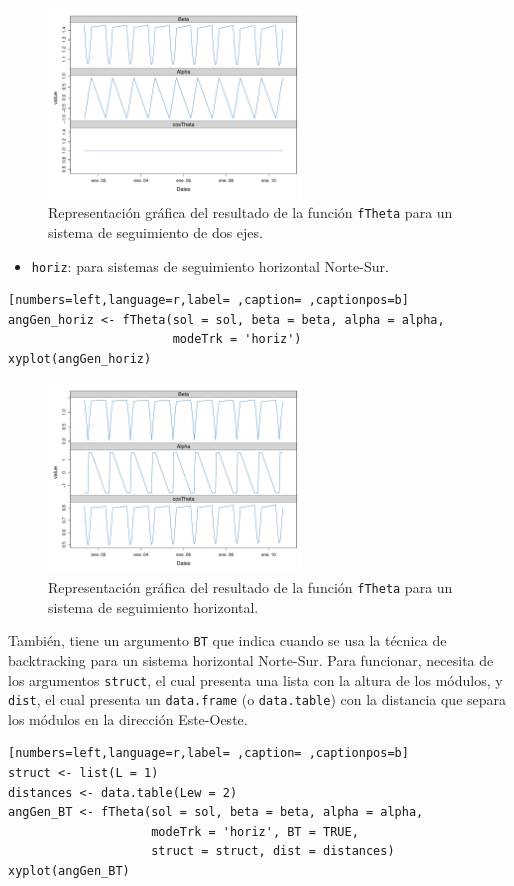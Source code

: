 \begin{itemize}
\begin{figure}[!htb]
\centering
\includegraphics[width=0.6\textwidth]{figuras/codigo-fthetatwo.pdf}
\caption{Representación gráfica del resultado de la función \texttt{fTheta} para un sistema de seguimiento de dos ejes.}
\end{figure}
\begin{itemize}
\item \texttt{horiz}: para sistemas de seguimiento horizontal Norte-Sur.
\end{itemize}
\begin{lstlisting}[numbers=left,language=r,label= ,caption= ,captionpos=b]
angGen_horiz <- fTheta(sol = sol, beta = beta, alpha = alpha,
                       modeTrk = 'horiz')
xyplot(angGen_horiz)
\end{lstlisting}

\begin{figure}[!htb]
\centering
\includegraphics[width=0.6\textwidth]{figuras/codigo-fthetahoriz.pdf}
\caption{Representación gráfica del resultado de la función \texttt{fTheta} para un sistema de seguimiento horizontal.}
\end{figure}
También, tiene un argumento \texttt{BT} que indica cuando se usa la técnica de backtracking para un sistema horizontal Norte-Sur. Para funcionar, necesita de los argumentos \texttt{struct}, el cual presenta una lista con la altura de los módulos, y \texttt{dist}, el cual presenta un \texttt{data.frame} (o \texttt{data.table}) con la distancia que separa los módulos en la dirección Este-Oeste.
\begin{lstlisting}[numbers=left,language=r,label= ,caption= ,captionpos=b]
struct <- list(L = 1)
distances <- data.table(Lew = 2)
angGen_BT <- fTheta(sol = sol, beta = beta, alpha = alpha,
                    modeTrk = 'horiz', BT = TRUE,
                    struct = struct, dist = distances)
xyplot(angGen_BT)
\end{lstlisting}


\end{itemize}
